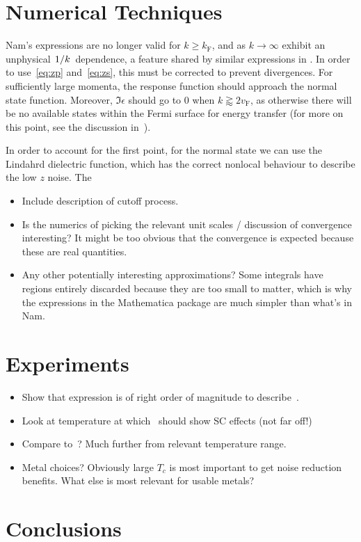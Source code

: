\documentclass{article}
\newcommand{\vf}{v_{\mathrm{F}}}
\begin{document}
\section{Numerical Techniques \label{sec:technical}}

	Nam's expressions are no longer valid for $k \geq k_\mathrm{F}$, and as $k \rightarrow \infty$ exhibit an unphysical $\flatfrac{1}{k}$ dependence, a feature shared by similar expressions in \cite{AGD}.
	In order to use~\eqref{eq:zp} and~\eqref{eq:zs}, this must be corrected to prevent divergences.
	For sufficiently large momenta, the response function should approach the normal state function.
	Moreover, $\Im \epsilon$ should go to $0$ when $k \gtrapprox 2 \vf$, as otherwise there will be no available states within the Fermi surface for energy transfer (for more on this point, see the discussion in~\cite{FetterWalecka}).

	In order to account for the first point, for the normal state we can use the Lindahrd dielectric function, which has the correct nonlocal behaviour to describe the low $z$ noise\cite{QubitRelax}.
	The 

\begin{itemize}
	\item Include description of cutoff process.
	\item Is the numerics of picking the relevant unit scales / discussion of convergence interesting?
	It might be too obvious that the convergence is expected because these are real quantities.
	\item Any other potentially interesting approximations?
	Some integrals have regions entirely discarded because they are too small to matter, which is why the expressions in the Mathematica package are much simpler than what's in Nam.
\end{itemize}

\section{Experiments \label{sec:experiments}}
\begin{itemize}
	\item Show that expression is of right order of magnitude to describe~\cite{Tenberg2019}.
	\item Look at temperature at which~\cite{Tenberg2019} should show SC effects (not far off!)
	\item Compare to~\cite{Kolkowitz2015}?
	Much further from relevant temperature range.
	\item Metal choices?
	Obviously large $T_c$ is most important to get noise reduction benefits.
	What else is most relevant for usable metals?
\end{itemize}
\section{Conclusions \label{sec:conclusions}}

\printbibliography
\end{document}
